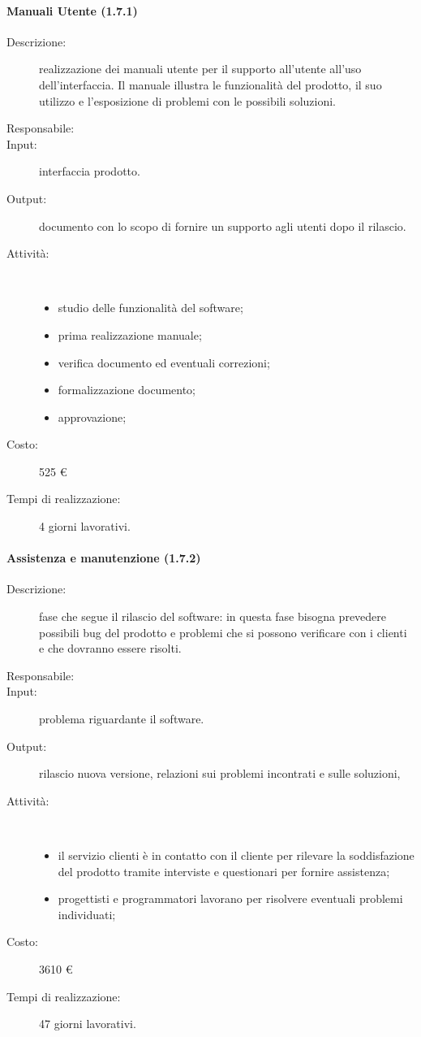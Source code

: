 \paragraph{Manuali Utente (1.7.1)}
\begin{description}
\item[Descrizione:] realizzazione dei manuali utente per il supporto all'utente all'uso dell'interfaccia. Il manuale illustra le funzionalit\`{a} del prodotto, il suo utilizzo e l'esposizione di problemi con le possibili soluzioni.
\item[Responsabile:] 
\item[Input:] interfaccia prodotto.
\item[Output:] documento con lo scopo di fornire un supporto agli utenti dopo il rilascio.
\item[Attività:]\mbox{}\\[-1.5\baselineskip]
	\begin{itemize}
	\item studio delle funzionalit\`{a} del software;
	\item prima realizzazione manuale;
	\item verifica documento ed eventuali correzioni;
	\item formalizzazione documento;
	\item approvazione;
	\end{itemize}
\item[Costo:] 525 \euro{}
\item[Tempi di realizzazione:] 4 giorni lavorativi.
\end{description}

\paragraph{Assistenza e manutenzione (1.7.2)}
\begin{description}
\item[Descrizione:] fase che segue il rilascio del software: in questa fase bisogna prevedere
possibili bug del prodotto e problemi che si possono verificare con i clienti e che dovranno essere risolti.
\item[Responsabile:] 
\item[Input:] problema riguardante il software.
\item[Output:] rilascio nuova versione, relazioni sui problemi incontrati e sulle soluzioni,
\item[Attività:]\mbox{}\\[-1.5\baselineskip]
	\begin{itemize}
	\item il servizio clienti \`{e} in contatto con il cliente per rilevare la
	soddisfazione del prodotto tramite interviste e questionari per fornire assistenza;
	\item progettisti e programmatori lavorano per risolvere eventuali problemi individuati;
	\end{itemize}
\item[Costo:] 3610 \euro{}
\item[Tempi di realizzazione:] 47 giorni lavorativi.
\end{description}

